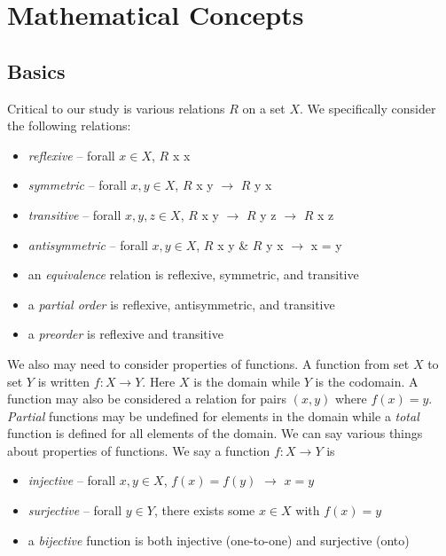 \section{Mathematical Concepts}

\subsection{Basics}

Critical to our study is various relations $R$ on a set $X$. We specifically consider the following relations: 

\begin{itemize}
    \item \emph{reflexive} -- forall $ x \in X$, $R$ x x
    \item \emph{symmetric} -- forall $ x , y\in X$, $R$ x y $\rightarrow$ $R$ y x
    \item \emph{transitive} -- forall $ x , y , z\in X$, $R$ x y $\rightarrow$ $R$ y z $\rightarrow$ $R$ x z
    \item \emph{antisymmetric} -- forall $ x , y\in X$, $R$ x y \& $R$ y x $\rightarrow$ x = y
    \item an \emph{equivalence} relation is reflexive, symmetric, and transitive 
    \item a \emph{partial order} is reflexive, antisymmetric, and transitive 
    \item a \emph{preorder} is reflexive and transitive
\end{itemize}

We also may need to consider properties of functions. A function from set $X$ to set $Y$ is written $f : X \rightarrow Y$. Here $X$ is the domain while $Y$ is the codomain. A function may also be considered a relation for pairs $(x,y)$ where $f(x) = y$. \emph{Partial} functions may be undefined for elements in the domain while a \emph{total} function is defined for all elements of the domain. We can say various things about properties of functions. We say a function $f : X \rightarrow Y$ is 

\begin{itemize}
    \item \emph{injective} -- forall $ x , y \in X$, $f(x) = f(y)$ $\rightarrow$  $x= y$
    \item \emph{surjective} -- forall $y \in Y$, there exists some $x \in X$ with  $f(x) = y$
    \item a \emph{bijective} function is both injective (one-to-one) and surjective (onto) 
\end{itemize}

